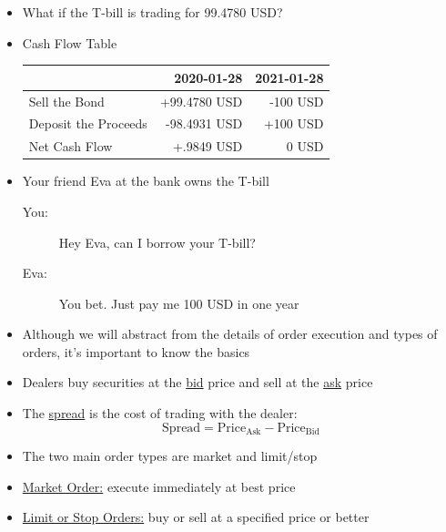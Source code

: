 \documentclass{beamer}
\begin{document}
\begin{frame}{}
\begin{itemize}
\item What if the T-bill is trading for 99.4780 USD?
\item Cash Flow Table
\begin{table}
\begin{center}
\begin{tabular}{lrr}
& \textbf{2020-01-28} & \textbf{2021-01-28} \\ \hline
Sell the Bond & +99.4780 USD & -100 USD \\
Deposit the Proceeds & -98.4931 USD & +100 USD \\ \hline
Net Cash Flow & +.9849 USD & 0 USD
\end{tabular}
\end{center}
\end{table}
\item Your friend Eva at the bank owns the T-bill 
\begin{description}
\item[You:] Hey Eva, can I borrow your T-bill? 
\item[Eva:] You bet. Just pay me 100 USD in one year
\end{description}
\end{itemize}
\end{frame}

\begin{frame}{}
\begin{itemize}
\item Although we will abstract from the details of order execution and types of orders, it's important to know the basics
\item Dealers buy securities at the \underline{bid} price and sell at the \underline{ask} price
\item The \underline{spread} is the cost of trading with the dealer:
\begin{equation*}
\text{Spread}=\text{Price}_{\text{Ask}}-\text{Price}_{\text{Bid}}
\end{equation*}
\item The two main order types are market and limit/stop
\item\underline{Market Order:} execute immediately at best price
\item\underline{Limit or Stop Orders:} buy or sell at a specified price or better
\end{itemize}
\end{frame}
\end{document}
